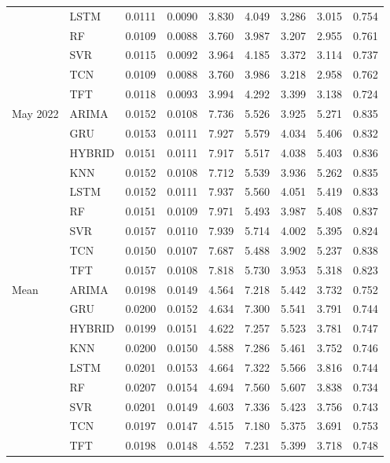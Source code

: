 \begin{tabular}{lllllllll}
 & LSTM & 0.0111 & 0.0090 & 3.830 & 4.049 & 3.286 & 3.015 & 0.754 \\
 & RF & 0.0109 & 0.0088 & 3.760 & 3.987 & 3.207 & 2.955 & 0.761 \\
 & SVR & 0.0115 & 0.0092 & 3.964 & 4.185 & 3.372 & 3.114 & 0.737 \\
 & TCN & 0.0109 & 0.0088 & 3.760 & 3.986 & 3.218 & 2.958 & 0.762 \\
 & TFT & 0.0118 & 0.0093 & 3.994 & 4.292 & 3.399 & 3.138 & 0.724 \\
May 2022 & ARIMA & 0.0152 & 0.0108 & 7.736 & 5.526 & 3.925 & 5.271 & 0.835 \\
 & GRU & 0.0153 & 0.0111 & 7.927 & 5.579 & 4.034 & 5.406 & 0.832 \\
 & HYBRID & 0.0151 & 0.0111 & 7.917 & 5.517 & 4.038 & 5.403 & 0.836 \\
 & KNN & 0.0152 & 0.0108 & 7.712 & 5.539 & 3.936 & 5.262 & 0.835 \\
 & LSTM & 0.0152 & 0.0111 & 7.937 & 5.560 & 4.051 & 5.419 & 0.833 \\
 & RF & 0.0151 & 0.0109 & 7.971 & 5.493 & 3.987 & 5.408 & 0.837 \\
 & SVR & 0.0157 & 0.0110 & 7.939 & 5.714 & 4.002 & 5.395 & 0.824 \\
 & TCN & 0.0150 & 0.0107 & 7.687 & 5.488 & 3.902 & 5.237 & 0.838 \\
 & TFT & 0.0157 & 0.0108 & 7.818 & 5.730 & 3.953 & 5.318 & 0.823 \\
Mean & ARIMA & 0.0198 & 0.0149 & 4.564 & 7.218 & 5.442 & 3.732 & 0.752 \\
 & GRU & 0.0200 & 0.0152 & 4.634 & 7.300 & 5.541 & 3.791 & 0.744 \\
 & HYBRID & 0.0199 & 0.0151 & 4.622 & 7.257 & 5.523 & 3.781 & 0.747 \\
 & KNN & 0.0200 & 0.0150 & 4.588 & 7.286 & 5.461 & 3.752 & 0.746 \\
 & LSTM & 0.0201 & 0.0153 & 4.664 & 7.322 & 5.566 & 3.816 & 0.744 \\
 & RF & 0.0207 & 0.0154 & 4.694 & 7.560 & 5.607 & 3.838 & 0.734 \\
 & SVR & 0.0201 & 0.0149 & 4.603 & 7.336 & 5.423 & 3.756 & 0.743 \\
 & TCN & 0.0197 & 0.0147 & 4.515 & 7.180 & 5.375 & 3.691 & 0.753 \\
 & TFT & 0.0198 & 0.0148 & 4.552 & 7.231 & 5.399 & 3.718 & 0.748 \\
\bottomrule
\end{tabular}
